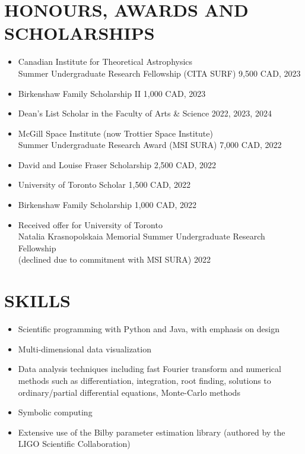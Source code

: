 \documentclass[a4paper,10pt]{extarticle}
\begin{document}
\section*{HONOURS, AWARDS AND SCHOLARSHIPS}
\begin{itemize}
    \item Canadian Institute for Theoretical Astrophysics \\
    Summer Undergraduate Research Fellowship (CITA SURF) \hfill 9,500 CAD, 2023
    
    \item Birkenshaw Family Scholarship II \hfill 1,000 CAD, 2023

    \item Dean's List Scholar in the Faculty of Arts \& Science \hfill 2022, 2023, 2024

    \item McGill Space Institute (now Trottier Space Institute) \\Summer Undergraduate Research Award (MSI SURA) \hfill 7,000 CAD, 2022

    \item David and Louise Fraser Scholarship \hfill 2,500 CAD, 2022

    \item University of Toronto Scholar \hfill 1,500 CAD, 2022

    \item Birkenshaw Family Scholarship \hfill 1,000 CAD, 2022

    \item Received offer for University of Toronto \\Natalia Krasnopolskaia Memorial Summer Undergraduate Research Fellowship \\(declined due to commitment with MSI SURA) \hfill 2022
\end{itemize}

\newpage
\section*{SKILLS}
\begin{itemize}
    \item Scientific programming with Python and Java, with emphasis on design

    \item Multi-dimensional data visualization

    \item Data analysis techniques including fast Fourier transform and numerical methods such as differentiation, integration, root finding, solutions to ordinary/partial differential equations, Monte-Carlo methods

    \item Symbolic computing

    \item Extensive use of the Bilby parameter estimation library (authored by the LIGO Scientific Collaboration)
\end{itemize}
\end{document}
